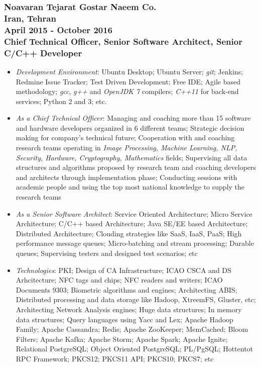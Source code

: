 \documentclass[10pt,a4paper]{article}
\begin{document}
\subsubsection{{\large Noavaran Tejarat Gostar Naeem Co.} \\ \textnormal{Iran, Tehran} \\  \textnormal{April 2015 - October 2016} \\ {Chief Technical Officer, Senior Software Architect, Senior C/C++ Developer}}
  \setlength{\leftskip}{0.5cm}
  \setlength{\rightskip}{1cm}
  \begin{itemize}
    \setlength{\rightskip}{1cm}
    \setlength\itemsep{0em}
    \item \small \textit {Development Environment}: Ubuntu Desktop; Ubuntu Server; \textit{git}; Jenkins; Redmine Issue Tracker; Test Driven Development; Free IDE; Agile based methodology; \textit {gcc}, \textit{g++} and \textit{OpenJDK 7} compilers; \textit{C++11} for back-end services; Python 2 and 3; etc.
    \item \small \textit {As a Chief Technical Officer}: Managing and coaching more than 15 software and hardware developers organized in 6 different teams; Strategic decision making for company's technical future; Cooperation with and coaching research teams operating in \textit {Image Processing, Machine Learning, NLP, Security, Hardware, Cryptography, Mathematics} fields; Supervising all data structures and algorithms proposed by research team and coaching developers and architects through implementation phase; Conducting sessions with academic people and using the top most national knowledge to supply the research teams
    \item \small \textit {As a Senior Software Architect}: Service Oriented Architecture; Micro Service Architecture; C/C++ based Architecture; Java SE/EE based Architecture; Distributed Architecture; Clouding strategies like SaaS, IaaS, PaaS; High performance message queues; Micro-batching and stream processing; Durable queues; Supervising testers and designed test scenarios; etc
    \item \small \textit {Technologies}: PKI; Design of CA Infrastructure; ICAO CSCA and DS Arhcitecture; NFC tags and chips; NFC readers and writers; ICAO Documents 9303; Biometric algorithms and engines; Architecting ABIS; Distributed processing and data storage like Hadoop, XtreemFS, Gluster, etc; Architecting Network Analysis engines; Huge data structures; In memory data structures; Query languages using Yacc and Lex; Apache Hadoop Family; Apache Cassandra; Redis; Apache ZooKeeper; MemCached; Bloom Filters; Apache Kafka; Apache Storm; Apache Spark; Apache Ignite; Relational PostgreSQL; Object Oriented PostgreSQL; PL/PgSQL; Hottentot RPC Framework; PKCS12; PKCS11 API; PKCS10; PKCS7; etc

\end{itemize}
\end{document}
